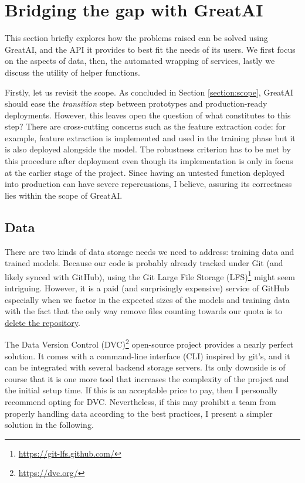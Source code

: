 \section{Bridging \textbf{the gap} with GreatAI}

This section briefly explores how the problems raised can be solved using GreatAI, and the API it provides to best fit the needs of its users. We first focus on the aspects of data, then, the automated wrapping of services, lastly we discuss the utility of helper functions.

Firstly, let us revisit the scope. As concluded in Section \ref{section:scope}, GreatAI should ease the \textit{transition} step between prototypes and production-ready deployments. However, this leaves open the question of what constitutes to this step? There are cross-cutting concerns such as the feature extraction code: for example, feature extraction is implemented and used in the training phase but it is also deployed alongside the model. The robustness criterion has to be met by this procedure after deployment even though its implementation is only in focus at the earlier stage of the project. Since having an untested function deployed into production can have severe repercussions, I believe, assuring its correctness lies within the scope of GreatAI.

\subsection{Data}

There are two kinds of data storage needs we need to address: training data and trained models. Because our code is probably already tracked under Git (and likely synced with GitHub), using the Git Large File Storage (LFS)\footnote{\href{https://git-lfs.github.com/}{https://git-lfs.github.com/}} might seem intriguing. However, it is a paid (and surprisingly expensive) service of GitHub especially when we factor in the expected sizes of the models and training data with the fact that the only way remove files counting towards our quota is to \href{https://docs.github.com/en/repositories/working-with-files/managing-large-files/removing-files-from-git-large-file-storage#git-lfs-objects-in-your-repository}{delete the repository}.

The Data Version Control (DVC)\footnote{\href{https://dvc.org/}{https://dvc.org/}} open-source project provides a nearly perfect solution. It comes with a command-line interface (CLI) inspired by git's, and it can be integrated with several backend storage servers. Its only downside is of course that it is one more tool that increases the complexity of the project and the initial setup time. If this is an acceptable price to pay, then I personally recommend opting for DVC. Nevertheless, if this may prohibit a team from properly handling data according to the best practices, I present a simpler solution in the following. 

